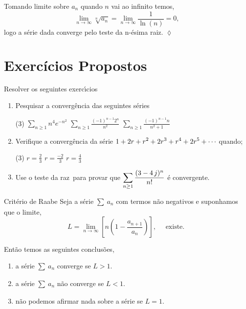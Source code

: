 Tomando limite sobre $a_n$ quando $n$ vai ao infinito temos,
\begin{equation*}
    \lim_{n\to\infty}\sqrt[n]{a_n}=\lim_{n\to\infty}\frac{1}{\ln(n)}=0,
\end{equation*}
logo a s\'{e}rie dada converge pelo teste da n-\'{e}sima raiz. \hfill
\(\lozenge\)

\section*{Exercícios Propostos} 
Resolver os seguintes exerc\'{\i}cios
\begin{enumerate}[label=\rm{(\arabic*)}]
\item Pesquisar a converg\^encia das seguintes s\'eries
\begin{tasks}[label=(\alph*),item-indent=6em,label-width=4ex,ref=(\alph*)](3)
\task \(\displaystyle{\sum_{n\geq 1}n^4 e^{-n^2}}\)
\task \(\displaystyle{\sum_{n\geq 1}\frac{(-1)^{n-1}2^n}{n^2}}\)
\task \(\displaystyle{\sum_{n\geq 1}\frac{(-1)^{n-1}n}{n^2+1}}\)
\end{tasks}

\item Verifique a converg\^encia da s\'erie $\displaystyle{1+2r+r^2+2r^3+r^4+2r^5+\cdots}$ quando;
\begin{tasks}[label=(\alph*),item-indent=5em,label-width=4ex,ref=(\alph*)](3)
\task \(\displaystyle{r=\frac{2}{3}}\)
\task \(\displaystyle{r=\frac{-2}{3}}\)
\task \(\displaystyle{r=\frac{4}{3}}\)
\end{tasks}

\item Use o teste da raz\ao\ para provar que $\displaystyle{\sum_{n\geq
1}\frac{(3-4\,j)^n}{n!}}$  \'e convergente.
\end{enumerate}

\begin{theoc}{Crit\'{e}rio de Raabe}{}
  Seja a s\'{e}rie $\sum_{}\,a_{n}$ com termos n\~{a}o negativos
e suponhamos que o limite,
\begin{equation*}
  L=\lim_{n\to\infty}\left[n\left(1-\frac{a_{n+1}}{a_n}\right)\right],\quad \text{ existe. }
\end{equation*}

Ent\~{a}o temos as seguintes conclus\~{o}es,
\begin{enumerate}[label=\rm{(\alph*)},leftmargin=4em,ref=\rm{(\alph*)}]
  \item a s\'{e}rie $\sum_{}\,a_{n}$ converge se $L>1$.
  \item a s\'{e}rie $\sum_{}\,a_{n}$ n\~{a}o converge se $L<1$.
  \item n\~{a}o podemos afirmar nada sobre a s\'{e}rie se $L=1$.
\end{enumerate}
\end{theoc}

